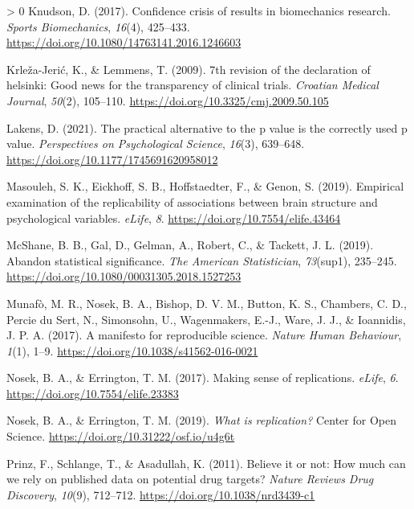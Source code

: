 \documentclass[]{cik}%
\newlength{\cslhangindent}
\newenvironment{CSLReferences}[3] %
 {%
  \setlength{\parindent}{0pt}
  \ifodd #1 \everypar{\setlength{\hangindent}{\cslhangindent}}\ignorespaces\fi
  \ifnum #2 > 0
  \setlength{\parskip}{#2\baselineskip}
  \fi
 }%
 {}
\begin{document}
\begin{CSLReferences}{1}{0}
\leavevmode\hypertarget{ref-knudson2017}{}%
Knudson, D. (2017). Confidence crisis of results in biomechanics
research. \emph{Sports Biomechanics}, \emph{16}(4), 425--433.
\url{https://doi.org/10.1080/14763141.2016.1246603}

\leavevmode\hypertarget{ref-KrleaJeri2009}{}%
Krleža-Jerić, K., \& Lemmens, T. (2009). 7th revision of the declaration
of helsinki: Good news for the transparency of clinical trials.
\emph{Croatian Medical Journal}, \emph{50}(2), 105--110.
\url{https://doi.org/10.3325/cmj.2009.50.105}

\leavevmode\hypertarget{ref-Lakens2021pvalue}{}%
Lakens, D. (2021). The practical alternative to the p value is the
correctly used p value. \emph{Perspectives on Psychological Science},
\emph{16}(3), 639--648. \url{https://doi.org/10.1177/1745691620958012}

\leavevmode\hypertarget{ref-Kharabian_Genon_2019}{}%
Masouleh, S. K., Eickhoff, S. B., Hoffstaedter, F., \& Genon, S. (2019).
Empirical examination of the replicability of associations between brain
structure and psychological variables. \emph{eLife}, \emph{8}.
\url{https://doi.org/10.7554/elife.43464}

\leavevmode\hypertarget{ref-mcshane2019abandon}{}%
McShane, B. B., Gal, D., Gelman, A., Robert, C., \& Tackett, J. L.
(2019). Abandon statistical significance. \emph{The American
Statistician}, \emph{73}(sup1), 235--245.
\url{https://doi.org/10.1080/00031305.2018.1527253}

\leavevmode\hypertarget{ref-munafo_manifesto_2017}{}%
Munafò, M. R., Nosek, B. A., Bishop, D. V. M., Button, K. S., Chambers,
C. D., Percie du Sert, N., Simonsohn, U., Wagenmakers, E.-J., Ware, J.
J., \& Ioannidis, J. P. A. (2017). A manifesto for reproducible science.
\emph{Nature Human Behaviour}, \emph{1}(1), 1--9.
\url{https://doi.org/10.1038/s41562-016-0021}

\leavevmode\hypertarget{ref-Nosek_Errington_2017}{}%
Nosek, B. A., \& Errington, T. M. (2017). Making sense of replications.
\emph{eLife}, \emph{6}. \url{https://doi.org/10.7554/elife.23383}

\leavevmode\hypertarget{ref-NosekErrington2019}{}%
Nosek, B. A., \& Errington, T. M. (2019). \emph{What is replication?}
Center for Open Science. \url{https://doi.org/10.31222/osf.io/u4g6t}

\leavevmode\hypertarget{ref-Prinz_Schlange_Asadullah_2011}{}%
Prinz, F., Schlange, T., \& Asadullah, K. (2011). Believe it or not: How
much can we rely on published data on potential drug targets?
\emph{Nature Reviews Drug Discovery}, \emph{10}(9), 712--712.
\url{https://doi.org/10.1038/nrd3439-c1}


\end{CSLReferences}
\end{document}
